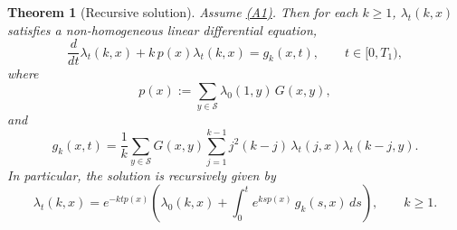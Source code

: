 \documentclass[12pt,twoside]{article}
\newtheorem{thm}{Theorem}[section]
\begin{document}
\begin{thm}[Recursive solution]
\label{thm:spatial-multiplicative}
Assume \hyperlink{ass:A1}{(A1)}. Then for each $k\ge1$, $\lambda_t(k,x)$ satisfies a non-homogeneous linear differential equation,
\begin{equation}\label{eq:triangular-thm}
\frac{d}{dt}\lambda_t(k,x)+k\,p(x)\lambda_t(k,x)=g_k(x,t), 
\qquad t\in[0,T_1),
\end{equation}
where
\[
p(x):=\sum_{y\in\mathcal S}\lambda_0(1,y)\,G(x,y),
\]
and
\begin{equation}\label{eq:gk-thm}
g_k(x,t)=\frac1k
\sum_{y\in\mathcal S} G(x,y)
\sum_{j=1}^{k-1} j^2(k-j)\,
\lambda_t(j,x)\lambda_t(k-j,y).
\end{equation}
In particular, the solution is recursively given by
\begin{equation}\label{lambdak}
\lambda_t(k,x)
=
e^{-k t p(x)}
\left(
\lambda_0(k,x)
+
\int_0^t e^{k s p(x)}\, g_k(s,x)\,ds
\right),
\qquad k\ge1.
\end{equation}
\end{thm}
\end{document}
